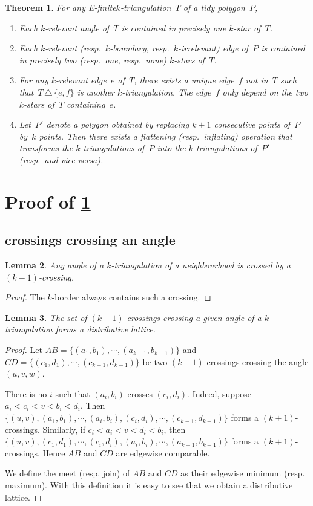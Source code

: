 \documentclass{amsart}
\newtheorem{theorem}{Theorem}[section]
\newtheorem{lemma}[theorem]{Lemma}
\theoremstyle{remark}
\newcommand*{\nbd}[0]{neighbourhood\xspace}
\newcommand*{\ef}[0]{E-finite\xspace}
\newcommand*{\ktg}[0]{$k$-triangulation\xspace}
\newcommand{\symdif}{\,\triangle\,} %
\newcommand{\viceversa}{\textit{vice versa}} %
\begin{document}
\begin{theorem}
\label{thm:flip}
For any \ef \ktg~$T$ of a tidy polygon~$P$,
\begin{enumerate}
\item Each $k$-relevant angle of~$T$ is contained in precisely one $k$-star of~$T$.
\item Each $k$-relevant (resp.~$k$-boundary, resp.~$k$-irrelevant) edge of~$P$ is contained in precisely two (resp.~one, resp.~none) $k$-stars of~$T$.
\item For any $k$-relevant edge~$e$ of~$T$, there exists a unique edge~$f$ not in~$T$ such that~$T \symdif \{e,f\}$ is another $k$-triangulation. The edge~$f$ only depend on the two $k$-stars of~$T$ containing~$e$.
\item Let~$P'$ denote a polygon obtained by replacing $k+1$ consecutive points of~$P$ by~$k$ points. Then there exists a flattening (resp.~inflating) operation that transforms the \ktg{}s of~$P$ into the \ktg{}s of~$P'$ (resp.~and \viceversa).
\end{enumerate}
\end{theorem}

\section{Proof of \cref{thm:flip}}

\subsection{crossings crossing an angle}

\begin{lemma}
Any angle of a \ktg of a \nbd is crossed by a $(k-1)$-crossing.
\end{lemma}
\begin{proof}
The $k$-border always contains such a crossing.
\end{proof}


\begin{lemma}
The set of $(k-1)$-crossings crossing a given angle of a \ktg forms a distributive lattice.
\end{lemma}
\begin{proof}
Let $AB=\{(a_1,b_1),\cdots,(a_{k-1},b_{k-1})\}$ and $CD=\{(c_1,d_1),\cdots,(c_{k-1},d_{k-1})\}$ be two $(k-1)$-crossings crossing the angle $(u,v,w)$.

There is no $i$ such that $(a_i,b_i)$ crosses $(c_i,d_i)$. 
Indeed, suppose $a_i<c_i<v<b_i<d_i$. Then $\{(u,v),(a_1,b_1),\cdots,(a_i,b_i),(c_i,d_i),\cdots,(c_{k-1},d_{k-1})\}$ forms a $(k+1)$-crossings. 
Similarly, if $c_i<a_i<v<d_i<b_i$, then $\{(u,v),(c_1,d_1),\cdots,(c_i,d_i),(a_i,b_i),\cdots,(a_{k-1},b_{k-1})\}$ forms a $(k+1)$-crossings.
Hence $AB$ and $CD$ are edgewise comparable.

We define the meet (resp. join) of $AB$ and $CD$ as their edgewise minimum (resp. maximum). With this definition it is easy to see that we obtain a distributive lattice.
\end{proof}
\end{document}
